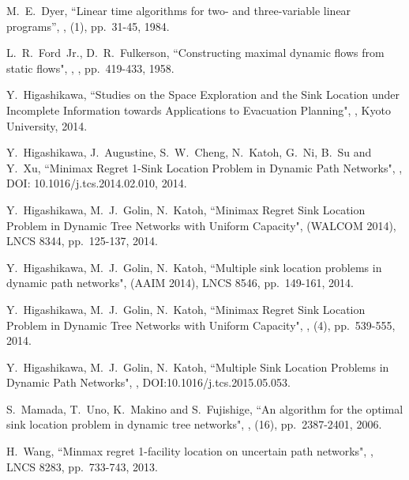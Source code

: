 \documentclass[a4paper]{llncs}
\begin{document}
\begin{thebibliography}{99}
	 M.~E.~Dyer, 
		\newblock ``Linear time algorithms for two- and three-variable linear programs'',
		,
		(1), pp.~31-45, 1984.
		
		L.~R.~Ford~Jr., D.~R.~Fulkerson,
		\newblock ``Constructing maximal dynamic flows from static flows",
		,
		, pp.~419-433, 1958.
	
		Y.~Higashikawa,
		\newblock ``Studies on the Space Exploration and the Sink Location under Incomplete Information towards Applications to Evacuation Planning",
		,
		\newblock Kyoto University, 2014.
			
		Y.~Higashikawa, J.~Augustine, S.~W.~Cheng, N.~Katoh, G.~Ni, B.~Su and Y.~Xu,
		\newblock ``Minimax Regret 1-Sink Location Problem in Dynamic Path Networks",
		,
		\newblock DOI: 10.1016/j.tcs.2014.02.010, 2014.
	
		Y.~Higashikawa, M.~J.~Golin, N.~Katoh,
		\newblock ``Minimax Regret Sink Location Problem in Dynamic Tree Networks with Uniform Capacity",
		 (WALCOM 2014),
		\newblock LNCS 8344, pp.~125-137, 2014.

		Y.~Higashikawa, M.~J.~Golin, N.~Katoh,
		\newblock ``Multiple sink location problems in dynamic path networks",
		 (AAIM 2014),
		\newblock LNCS 8546, pp.~149-161, 2014.
		
		Y.~Higashikawa, M.~J.~Golin, N.~Katoh,
		\newblock ``Minimax Regret Sink Location Problem in Dynamic Tree Networks with Uniform Capacity",
		,
		(4), pp.~539-555, 2014.

		Y.~Higashikawa, M.~J.~Golin, N.~Katoh,
		\newblock ``Multiple Sink Location Problems in Dynamic Path Networks",
		,
		\newblock DOI:10.1016/j.tcs.2015.05.053.
	






		S.~Mamada, T.~Uno, K.~Makino and S.~Fujishige,
		\newblock ``An  algorithm for the optimal sink location problem in dynamic tree networks",
		,
		(16), pp.~2387-2401, 2006. 





		H.~Wang, 
		\newblock ``Minmax regret 1-facility location on uncertain path networks",
		,
		\newblock LNCS 8283, pp.~733-743, 2013.

\end{thebibliography}
\end{document}

